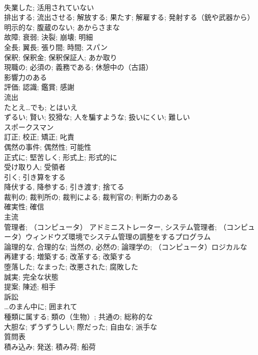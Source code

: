 \documentclass[8pt]{extreport}
\begin{document}
\begin{CJK}{UTF8}{min}
\\	失業した; 活用されていない	
\\	排出する; 流出させる; 解放する; 果たす; 解雇する; 発射する（銃や武器から）	
\\	明示的な; 腹蔵のない; あからさまな	
\\	故障; 衰弱; 決裂; 崩壊; 明細	
\\	全長; 翼長; 張り間; 時間; スパン	
\\	保釈; 保釈金; 保釈保証人; あか取り	
\\	現職の; 必須の; 義務である; 休憩中の（古語）	
\\	影響力のある	
\\	評価; 認識; 鑑賞; 感謝	
\\	流出	
\\	たとえ…でも; とはいえ	
\\	ずるい; 賢い; 狡猾な; 人を騙すような; 扱いにくい; 難しい	
\\	スポークスマン	
\\	訂正; 校正; 矯正; 叱責	
\\	偶然の事件; 偶然性; 可能性	
\\	正式に; 堅苦しく; 形式上; 形式的に	
\\	受け取り人; 受領者	
\\	引く; 引き算をする	
\\	降伏する, 降参する; 引き渡す; 捨てる	
\\	裁判の; 裁判所の; 裁判による; 裁判官の; 判断力のある	
\\	確実性; 確信	
\\	主流	
\\	管理者; （コンピュータ） アドミニストレーター, システム管理者; （コンピュータ）ウィンドウズ環境でシステム管理の調整をするプログラム	
\\	論理的な, 合理的な; 当然の, 必然の; 論理学の; （コンピュータ）ロジカルな	
\\	再建する; 増築する; 改革する; 改築する	
\\	堕落した; なまった; 改悪された; 腐敗した	
\\	誠実; 完全な状態	
\\	提案; 陳述; 相手	
\\	訴訟	
\\	…のまん中に; 囲まれて	
\\	種類に属する; 類の（生物）; 共通の; 総称的な	
\\	大胆な; ずうずうしい; 際だった; 自由な; 派手な	
\\	質問表	
\\	積み込み; 発送; 積み荷; 船荷	

\end{CJK}
\end{document}
